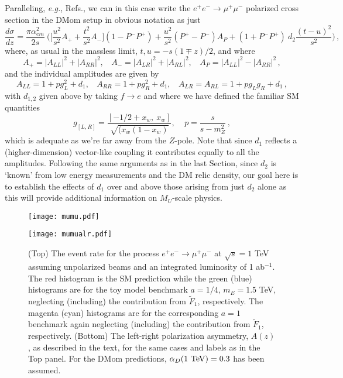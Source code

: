 \documentclass[14pt]{article}
\def\eg{{\it e.g.}}
\def\to{\rightarrow}
\begin{document}
{Paralleling, \eg, Refs.\cite{Pasztor:2001hc,Pankov:2004ma}, we can in this case write the $e^+e^-\to \mu^+\mu^-$ polarized cross section in the DMom setup in obvious notation as just
%
\begin{equation}
\frac{d\sigma}{dz}=\frac{\pi \alpha_{em}^2}{2s}~\Bigg(\Big[\frac{u^2}{s^2}A_++\frac{t^2}{s^2}A_-\Big](1-P^-P^+)+\frac{u^2}{s^2}(P^+ -P^-)A_P+(1+P^-P^+)~d_2\frac{(t-u)^2}{s^2}\Bigg)\,,  
\end{equation}
%
where, as usual in the massless limit, $t,u=-s(1\mp z)/2$, and where 
%
\begin{equation}
A_+=|A_{LL}|^2+|A_{RR}|^2, ~~~~A_-=|A_{LR}|^2+|A_{RL}|^2,~~~~A_P=|A_{LL}|^2-|A_{RR}|^2\,,  
\end{equation}
%
and the individual amplitudes are given by
%
\begin{equation}
A_{LL}=1+pg_L^2+d_1, ~~~~A_{RR}=1+pg_R^2+d_1,~~~~A_{LR}=A_{RL}=1+pg_Lg_R+d_1\,,
 \end{equation} 
%
with $d_{1,2}$ given above by taking $f\to e$ and where we have defined the familiar SM quantities
%
\begin{equation}
g_{[L,R]}=\frac{[-1/2+x_w,~x_w]}{\sqrt {(x_w(1-x_w)}}, ~~~~~p=\frac{s}{s-m_Z^2}\,,  
\end{equation}
%
which is adequate as we're far away from the $Z$-pole. Note that since $d_1$ reflects a (higher-dimension) vector-like coupling it contributes equally to all the amplitudes. Following the same arguments as 
in the last Section, since $d_2$ is `known'  from low energy measurements and the DM relic density, our goal here is to establish the effects of $d_1$ over and above those arising from just $d_2$ alone 
as this will provide additional information on $M_U$-scale physics. 

%
\begin{figure}[htbp]
\centerline{\texttt{[image: mumu.pdf]}}
\vspace*{-0.8cm}
\centerline{\texttt{[image: mumualr.pdf]}}
\vspace*{-1.3cm}
\caption{(Top)  The event rate for the process $e^+e^-\to \mu^+\mu^-$ at $\sqrt s=1$ TeV assuming unpolarized beams and an integrated luminosity of 1 ab$^{-1}$. The red histogram is the SM 
prediction while the green (blue) histograms are for the toy model benchmark $a=1/4$, $m_E=1.5$ TeV, neglecting (including) the contribution from $\tilde F_1$, respectively. The magenta 
(cyan) histograms are for the corresponding $a=1$ benchmark again neglecting (including) the contribution from $\tilde F_1$, respectively. (Bottom) The left-right polarization asymmetry, $A(z)$, 
as described in the text, for the same cases and labels as in the Top panel. For the DMom predictions, $\alpha_D(1~ {\rm TeV})=0.3$ has been assumed.}
\label{figmu}
\end{figure}
%

}
\end{document}

